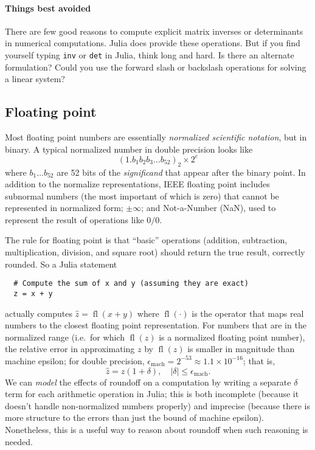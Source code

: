 \documentclass[12pt, leqno]{article}
\begin{document}
\paragraph{Things best avoided}
There are few good reasons to compute explicit matrix inverses or
determinants in numerical computations.  Julia does provide these
operations.  But if you find yourself typing {\tt inv} or {\tt det} in
Julia, think long and hard.  Is there an alternate formulation?
Could you use the forward slash or backslash operations for solving a
linear system?

\subsection{Floating point}
Most floating point numbers are essentially
{\em normalized scientific notation}, but in binary.
A typical normalized number in double precision looks like
\[
  (1.b_1 b_2 b_3 \ldots b_{52})_2 \times 2^{e}
\]
where $b_1 \ldots b_{52}$ are 52 bits of the {\em significand}
that appear after the binary point.  In addition to the normalize
representations, IEEE floating point includes subnormal numbers
(the most important of which is zero) that cannot be represented
in normalized form; $\pm \infty$; and Not-a-Number (NaN), used
to represent the result of operations like $0/0$.

The rule for floating point is that ``basic'' operations
(addition, subtraction, multiplication, division, and square root)
should return the true result, correctly rounded.  So a Julia
statement
\begin{lstlisting}
  # Compute the sum of x and y (assuming they are exact)
  z = x + y
\end{lstlisting}
actually computes $\hat{z} = \operatorname{fl}(x+y)$ where
$\operatorname{fl}(\cdot)$ is the operator that maps real numbers to
the closest floating point representation.  For numbers that are in
the normalized range (i.e.~for which $\operatorname{fl}(z)$ is a
normalized floating point number), the relative error in approximating
$z$ by $\operatorname{fl}(z)$ is smaller in magnitude than machine
epsilon; for double precision, $\epsilon_{\mathrm{mach}} = 2^{-53}
\approx 1.1 \times 10^{-16}$; that is,
\[
  \hat{z} = z(1+\delta), \quad |\delta| \leq \epsilon_{\mathrm{mach}}.
\]
We can {\em model} the effects of roundoff on a computation by writing
a separate $\delta$ term for each arithmetic operation in Julia;
this is both incomplete (because it doesn't handle non-normalized
numbers properly) and imprecise (because there is more structure to
the errors than just the bound of machine epsilon).  Nonetheless,
this is a useful way to reason about roundoff when such reasoning
is needed.
\end{document}
